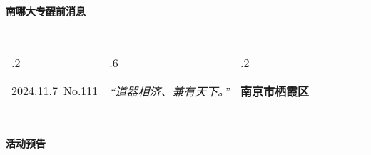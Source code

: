 \documentclass[letterpaper, 12pt]{article}
\begin{document}
\begin{center}
    \Huge\textbf{南哪大专醒前消息}
\end{center}
\vspace{4mm}
\hrule
\renewcommand\tabularxcolumn[1]{m{#1}}
\begin{tabularx}{\textwidth}{>{\hsize.2\hsize}X>{\hsize.6\hsize}X>{\hsize.2\hsize}X}
    \begin{flushleft}
        2024.11.7\, No.111
    \end{flushleft}
    &
    \begin{center}
        \textit{“道器相济、兼有天下。”}
    \end{center}
    &
    \begin{flushright}
        \textbf{南京市栖霞区}
    \end{flushright}
\end{tabularx}
\vspace{-3.5mm}
\hrule
\vspace{4mm}
\centerline{\huge\textbf{活动预告}}
\end{document}
